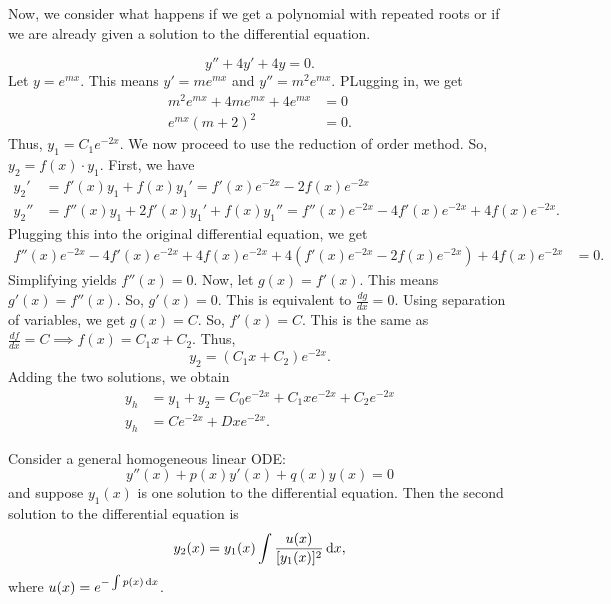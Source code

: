 Now, we consider what happens if we get a polynomial with repeated roots or
if we are already given a solution to the differential equation.
\newpage
\begin{example}
    $$y''+4y'+4y=0.$$
    Let $y=e^{mx}$. This means $y'=me^{mx}$ and $y''=m^2e^{mx}$. PLugging in, 
    we get
    \begin{align*}
        m^2e^{mx}+4me^{mx}+4e^{mx} &= 0 \\
        e^{mx}(m+2)^2 &= 0.
    \end{align*}
    Thus, $\boxed{y_1 = C_1e^{-2x}}$. We now proceed to use the  \alert{reduction of order} 
    method.
    So, $y_2 = f(x)\cdot y_1$. First, we have 
    \begin{align*}
        y_2' &= f'(x)y_1+f(x)y_1' = f'(x)e^{-2x}-2f(x)e^{-2x}\\
        y_2'' &= f''(x)y_1+2f'(x)y_1'+f(x)y_1'' = f''(x)e^{-2x}-4f'(x)e^{-2x}+4f(x)e^{-2x}.
    \end{align*}
    Plugging this into the original differential equation, we get
    \begin{align*}
        f''(x)e^{-2x}-4f'(x)e^{-2x}+4f(x)e^{-2x} + 4\left(f'(x)e^{-2x}-2f(x)e^{-2x} \right)
        + 4f(x)e^{-2x} &= 0.
    \end{align*}
    Simplifying yields $f''(x) = 0$. Now, let $g(x) = f'(x)$. This means
    $g'(x) = f''(x)$. So, $g'(x) = 0$. This is equivalent to $\frac{dg}{dx} = 0$.
    Using separation of variables, we get $g(x) = C$. So, $f'(x) = C$. This is
    the same as $\frac{df}{dx} = C \implies f(x) = C_1x+C_2$. Thus,
    $$\boxed{y_2 = \left(C_1x+C_2\right)e^{-2x}}.$$
    Adding the two solutions, we obtain
    \begin{align*}
        y_h &= y_1 + y_2 = C_0e^{-2x} + C_1 xe^{-2x} +C_2e^{-2x} \\
        y_h &= Ce^{-2x} + Dxe^{-2x}.
    \end{align*}
\end{example}
\begin{theorem}
    Consider a general homogeneous linear ODE:
    $$y''(x)+p(x)y'(x)+q(x)y(x)=0$$
    and suppose $y_1(x)$ is one solution to the differential equation. Then
    the second solution to the differential equation is
    $$y_2(x) = y_1(x)\int \frac{u(x)}{[y_1(x)]^2} \dif x,$$
    where $u(x) = e^{-\int p(x) \dif x}$.
\end{theorem}
